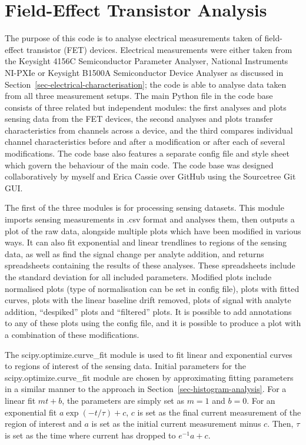 \documentclass[
  a4paper,
]{scrbook}
\begin{document}
\hypertarget{sec-field-effect-transistor-analysis}{%
\section{Field-Effect Transistor
Analysis}\label{sec-field-effect-transistor-analysis}}

The purpose of this code is to analyse electrical measurements taken of
field-effect transistor (FET) devices. Electrical measurements were
either taken from the Keysight 4156C Semiconductor Parameter Analyser,
National Instruments NI-PXIe or Keysight B1500A Semiconductor Device
Analyser as discussed in Section~\ref{sec-electrical-characterisation};
the code is able to analyse data taken from all three measurement
setups. The main Python file in the code base consists of three related
but independent modules: the first analyses and plots sensing data from
the FET devices, the second analyses and plots transfer characteristics
from channels across a device, and the third compares individual channel
characteristics before and after a modification or after each of several
modifications. The code base also features a separate config file and
style sheet which govern the behaviour of the main code. The code base
was designed collaboratively by myself and Erica Cassie over GitHub
using the Sourcetree Git GUI.

The first of the three modules is for processing sensing datasets. This
module imports sensing measurements in .csv format and analyses them,
then outputs a plot of the raw data, alongside multiple plots which have
been modified in various ways. It can also fit exponential and linear
trendlines to regions of the sensing data, as well as find the signal
change per analyte addition, and returns spreadsheets containing the
results of these analyses. These spreadsheets include the standard
deviation for all included parameters. Modified plots include normalised
plots (type of normalisation can be set in config file), plots with
fitted curves, plots with the linear baseline drift removed, plots of
signal with analyte addition, ``despiked'' plots and ``filtered'' plots.
It is possible to add annotations to any of these plots using the config
file, and it is possible to produce a plot with a combination of these
modifications.

The scipy.optimize.curve\_fit module is used to fit linear and
exponential curves to regions of interest of the sensing data. Initial
parameters for the scipy.optimize.curve\_fit module are chosen by
approximating fitting parameters in a similar manner to the approach in
Section~\ref{sec-histogram-analysis}. For a linear fit \(mt + b\), the
parameters are simply set as \(m=1\) and \(b=0\). For an exponential fit
\(a\exp{(-t/\tau)} + c\), \(c\) is set as the final current measurement
of the region of interest and \(a\) is set as the initial current
measurement minus \(c\). Then, \(\tau\) is set as the time where current
has dropped to \(e^{-1}a + c\).
\end{document}
